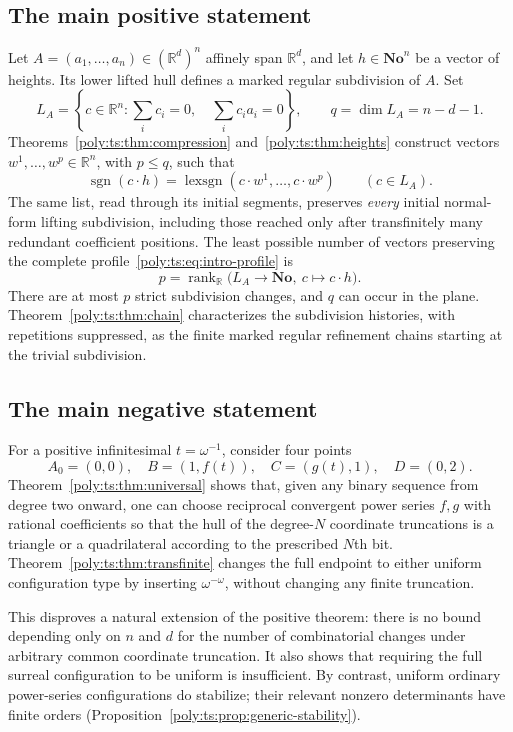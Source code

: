 \documentclass[11pt,a4paper]{article}
\numberwithin{equation}{section}
\theoremstyle{plain}
\newcommand{\No}{\mathbf{No}}
\newcommand{\R}{\mathbb R}
\newcommand{\sgn}{\operatorname{sgn}}
\newcommand{\rank}{\operatorname{rank}}
\newcommand{\lexsgn}{\operatorname{lexsgn}}
\begin{document}
\subsection{The main positive statement}
Let $A=(a_1,\ldots,a_n)\in(\R^d)^n$ affinely span $\R^d$, and let
$h\in\No^n$ be a vector of heights. Its lower lifted hull defines a marked
regular subdivision of $A$. Set
\[
 L_A=\left\{c\in\R^n:\sum_i c_i=0,\quad\sum_i c_i a_i=0\right\},
 \qquad q=\dim L_A=n-d-1.
\]
Theorems~\ref{poly:ts:thm:compression} and~\ref{poly:ts:thm:heights} construct vectors
$w^1,\ldots,w^p\in\R^n$, with $p\le q$, such that
\begin{equation}\label{poly:ts:eq:intro-profile}
 \sgn(c\cdot h)=\lexsgn(c\cdot w^1,\ldots,c\cdot w^p)
 \qquad(c\in L_A).
\end{equation}
The same list, read through its initial segments, preserves \emph{every}
initial normal-form lifting subdivision, including those reached only after
transfinitely many redundant coefficient positions. The least possible
number of vectors preserving the complete profile~\eqref{poly:ts:eq:intro-profile}
is
\[
 p=\rank_{\R}\bigl(L_A\longrightarrow\No,\ c\longmapsto c\cdot h\bigr).
\]
There are at most $p$ strict subdivision changes, and $q$ can occur in the
plane. Theorem~\ref{poly:ts:thm:chain} characterizes the subdivision histories,
with repetitions suppressed, as the finite marked regular refinement chains
starting at the trivial subdivision.

\subsection{The main negative statement}
For a positive infinitesimal $t=\omega^{-1}$, consider four points
\[
 A_0=(0,0),\quad B=(1,f(t)),\quad C=(g(t),1),\quad D=(0,2).
\]
Theorem~\ref{poly:ts:thm:universal} shows that, given any binary sequence from degree
two onward, one can choose reciprocal convergent power series $f,g$ with
rational coefficients so that the hull of the degree-$N$ coordinate
truncations is a triangle or a quadrilateral according to the prescribed
$N$th bit. Theorem~\ref{poly:ts:thm:transfinite} changes the full endpoint to either
uniform configuration type by inserting $\omega^{-\omega}$, without changing
any finite truncation.

This disproves a natural extension of the positive theorem: there is no
bound depending only on $n$ and $d$ for the number of combinatorial changes
under arbitrary common coordinate truncation. It also shows that requiring
the full surreal configuration to be uniform is insufficient. By contrast,
uniform ordinary power-series configurations do stabilize; their relevant
nonzero determinants have finite orders
(Proposition~\ref{poly:ts:prop:generic-stability}).
\end{document}

